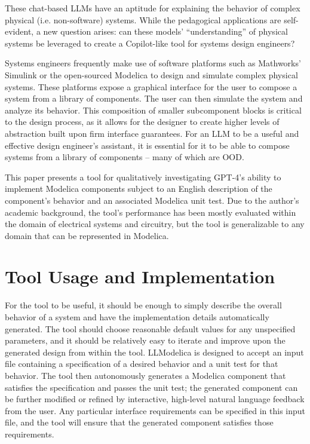 \documentclass[11pt]{article}
\let\oldsection\section
\renewcommand\section{\clearpage\oldsection}
\begin{document}
These chat-based LLMs have an aptitude for explaining the behavior of complex physical (i.e. non-software) systems. While the pedagogical applications are self-evident, a new question arises: can these models' ``understanding'' of physical systems be leveraged to create a Copilot-like tool for systems design engineers?

Systems engineers frequently make use of software platforms such as Mathworks' Simulink or the open-sourced Modelica to design and simulate complex physical systems. These platforms expose a graphical interface for the user to compose a system from a library of components. The user can then simulate the system and analyze its behavior. This composition of smaller subcomponent blocks is critical to the design process, as it allows for the designer to create higher levels of abstraction built upon firm interface guarantees. For an LLM to be a useful and effective design engineer's assistant, it is essential for it to be able to compose systems from a library of components -- many of which are OOD.

This paper presents a tool for qualitatively investigating GPT-4's ability to implement Modelica components subject to an English description of the component's behavior and an associated Modelica unit test. Due to the author's academic background, the tool's performance has been mostly evaluated within the domain of electrical systems and circuitry, but the tool is generalizable to any domain that can be represented in Modelica.

\section{Tool Usage and Implementation}
\label{sec:org6f69565}
For the tool to be useful, it should be enough to simply describe the overall behavior of a system and have the implementation details automatically generated. The tool should choose reasonable default values for any unspecified parameters, and it should be relatively easy to iterate and improve upon the generated design from within the tool. LLModelica is designed to accept an input file containing a specification of a desired behavior and a unit test for that behavior. The tool then autonomously generates a Modelica component that satisfies the specification and passes the unit test; the generated component can be further modified or refined by interactive, high-level natural language feedback from the user. Any particular interface requirements can be specified in this input file, and the tool will ensure that the generated component satisfies those requirements.
\end{document}
